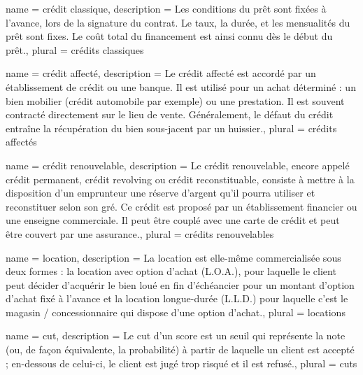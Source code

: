 







{
	name = crédit classique,
	description = {Les conditions du prêt sont fixées à l’avance, lors de la signature du contrat. Le taux, la durée, et les mensualités du prêt sont fixes. Le coût total du financement est ainsi connu dès le début du prêt.},
	plural = crédits classiques
}

{
	name = crédit affecté,
	description = {Le crédit affecté est accordé par un établissement de crédit ou une banque. Il est utilisé pour un achat déterminé : un bien mobilier (crédit automobile par exemple) ou une prestation. Il est souvent contracté directement sur le lieu de vente. Généralement, le défaut du crédit entraîne la récupération du bien sous-jacent par un huissier.},
	plural = crédits affectés
}

{
	name = crédit renouvelable,
	description = {Le crédit renouvelable, encore appelé crédit permanent, crédit revolving ou crédit reconstituable, consiste à mettre à la disposition d'un emprunteur une réserve d'argent qu'il pourra utiliser et reconstituer selon son gré. Ce crédit est proposé par un établissement financier ou une enseigne commerciale. Il peut être couplé avec une carte de crédit et peut être couvert par une assurance.},
	plural = crédits renouvelables
}

{
	name = location,
	description = {La location est elle-même commercialisée sous deux formes : la location avec option d'achat (L.O.A.), pour laquelle le client peut décider d'acquérir le bien loué en fin d'échéancier pour un montant d'option d'achat fixé à l'avance et la location longue-durée (L.L.D.) pour laquelle c'est le magasin / concessionnaire qui dispose d'une option d'achat.},
	plural = locations
}

{
	name = cut,
	description = {Le cut d'un score est un seuil qui représente la note (ou, de façon équivalente, la probabilité) à partir de laquelle un client est accepté ; en-dessous de celui-ci, le client est jugé trop risqué et il est refusé.},
	plural = cuts
}


